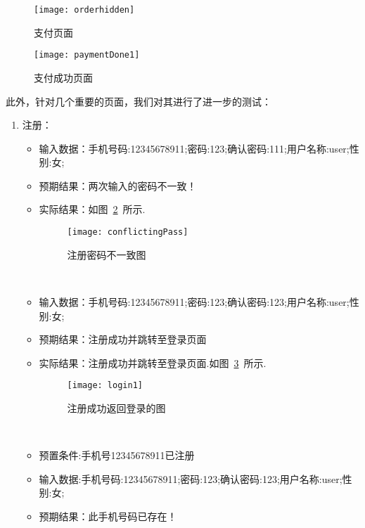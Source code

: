 \begin{figure}[htbp]
    \centering
    \begin{minipage}{0.4\textwidth}
        \centering
        \texttt{[image: orderhidden]}
        \caption{支付页面}\label{fig:orderhidden}
    \end{minipage}
    \begin{minipage}{0.4\textwidth}
        \centering
        \texttt{[image: paymentDone1]}
        \caption{支付成功页面}\label{fig:paymentDone1}
    \end{minipage}
\end{figure}
此外，针对几个重要的页面，我们对其进行了进一步的测试：
\begin{enumerate}
    \item{注册}：
    \begin{itemize}
        \item{输入数据}：手机号码:12345678911;密码:123;确认密码:111;用户名称:user;性别:女;
        \item {预期结果}：两次输入的密码不一致！
        \item {实际结果}：如图~\ref{fig:conflictingPass}~所示.
              \begin{figure}[htbp]
                  \centering
                  \texttt{[image: conflictingPass]}
                  \caption{注册密码不一致图}\label{fig:conflictingPass}
              \end{figure}
              ~\\
              \item{输入数据}：手机号码:12345678911;密码:123;确认密码:123;用户名称:user;性别:女;
        \item {预期结果}：注册成功并跳转至登录页面
        \item {实际结果}：注册成功并跳转至登录页面.如图~\ref{fig:login1}~所示.
              \begin{figure}[htbp]
                  \centering
                  \texttt{[image: login1]}
                  \caption{注册成功返回登录的图}\label{fig:login1}
              \end{figure}
              ~\\
              \item{预置条件}:手机号12345678911已注册
              \item{输入数据}:手机号码:12345678911;密码:123;确认密码:123;用户名称:user;性别:女;
        \item {预期结果}：此手机号码已存在！

\end{itemize}
\end{enumerate}
